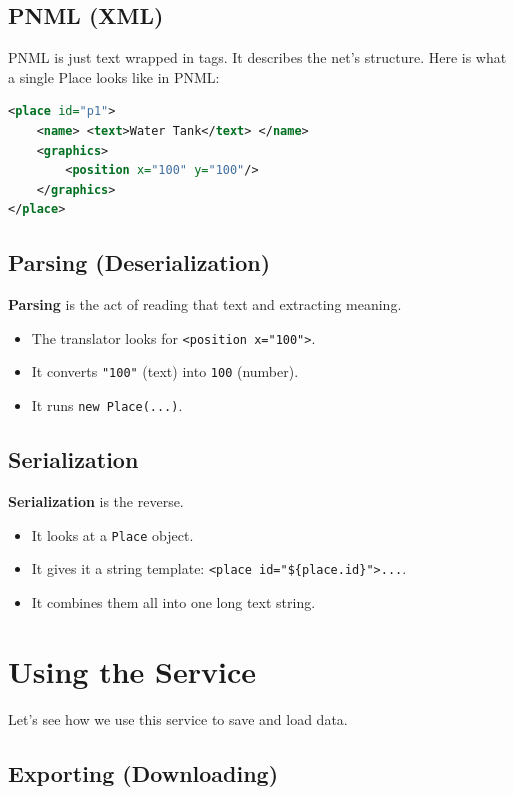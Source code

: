 \documentclass[a4paper,11pt,oneside]{report}
\begin{document}
\subsection{PNML (XML)}

PNML is just text wrapped in tags. It describes the net's structure.
Here is what a single Place looks like in PNML:

\begin{lstlisting}[language=XML]
<place id="p1">
    <name> <text>Water Tank</text> </name>
    <graphics>
        <position x="100" y="100"/>
    </graphics>
</place>
\end{lstlisting}

\subsection{Parsing (Deserialization)}

\textbf{Parsing} is the act of reading that text and extracting meaning.
\begin{itemize}
    \item The translator looks for \texttt{<position x="100">}.
    \item It converts \texttt{"100"} (text) into \texttt{100} (number).
    \item It runs \texttt{new Place(...)}.
\end{itemize}

\subsection{Serialization}

\textbf{Serialization} is the reverse.
\begin{itemize}
    \item It looks at a \texttt{Place} object.
    \item It gives it a string template: \texttt{<place id="\$\{place.id\}">...}.
    \item It combines them all into one long text string.
\end{itemize}

\section{Using the Service}

Let's see how we use this service to save and load data.

\subsection{Exporting (Downloading)}
\end{document}
